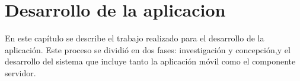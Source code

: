 \chapter{Desarrollo de la aplicacion}\label{chapter:Desarrollo de la aplicacion}

En este capítulo se describe el trabajo realizado para el desarrollo de la aplicación. Este proceso se dividió en dos fases: investigación y concepción,y el desarrollo del sistema que incluye tanto la aplicación móvil como el componente servidor.